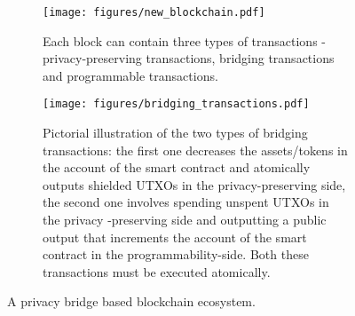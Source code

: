 \documentclass{article}
\begin{document}
\begin{figure}[h]
     \centering
     \begin{subfigure}[b]{\textwidth}
         \centering
         \texttt{[image: figures/new\_blockchain.pdf]}
         \caption{Each block can contain three types of transactions - privacy-preserving transactions, bridging transactions and programmable transactions.}
         \label{fig:new_blockchain}
     \end{subfigure}
     \hfill
     \begin{subfigure}[b]{\textwidth}
         \centering
         \texttt{[image: figures/bridging\_transactions.pdf]}
         \caption{Pictorial illustration of the two types of bridging transactions: the first one decreases the assets/tokens in the account of the smart contract and atomically outputs  shielded UTXOs in the privacy-preserving side, the second one involves spending unspent UTXOs in the privacy -preserving side and outputting a public output that increments the account of the smart contract in the programmability-side. Both these transactions must be executed atomically.}
         \label{fig:bridging-transaction}
     \end{subfigure}
        \caption{A privacy bridge based blockchain ecosystem.}
        \label{fig:new-blockchain-description}
\end{figure}
\end{document}
